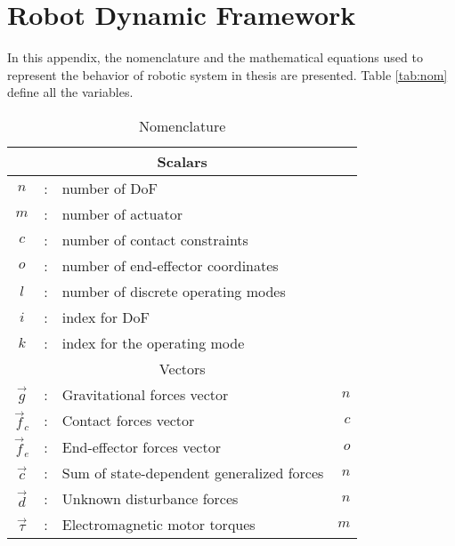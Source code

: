 \chapter{Robot Dynamic Framework}
\label{sec:robotdynamic}

In this appendix, the nomenclature and the mathematical equations used to represent the behavior of robotic system in thesis are presented. Table \ref{tab:nom} define all the variables.

\begin{table}[htbp]
	\centering
	\caption{Nomenclature}	%
		\begin{tabular}{ c c l r }
        \hline \hline
				\multicolumn{4}{c}{Scalars} \\
				\hline \hline
			$n$             &  :  & number of DoF                                              & \\
			$m$             &  :  & number of actuator                                         & \\
			$c$             &  :  & number of contact constraints                              & \\
			$o$             &  :  & number of end-effector coordinates                         & \\ 
			$l$             &  :  & number of discrete operating modes                         & \\ 
			$i$             &  :  & index for DoF                                              & \\
			$k$             &  :  & index for the operating mode                               & \\ 
			\hline \hline
			\multicolumn{4}{c}{Vectors} \\
			\hline \hline
			$\vec{g}$       &  :  & Gravitational forces vector                                & $n$  \\
			$\vec{f}_c$     &  :  & Contact forces vector                                      & $c$  \\
			$\vec{f}_e$     &  :  & End-effector forces vector                                 & $o$  \\
			$\vec{c}$       &  :  & Sum of state-dependent generalized forces                  & $n$  \\
			$\vec{d}$       &  :  & Unknown disturbance forces                                 & $n$  \\
			$\vec{\tau}$    &  :  & Electromagnetic motor torques                              & $m$  \\

\end{tabular}
\end{table}
